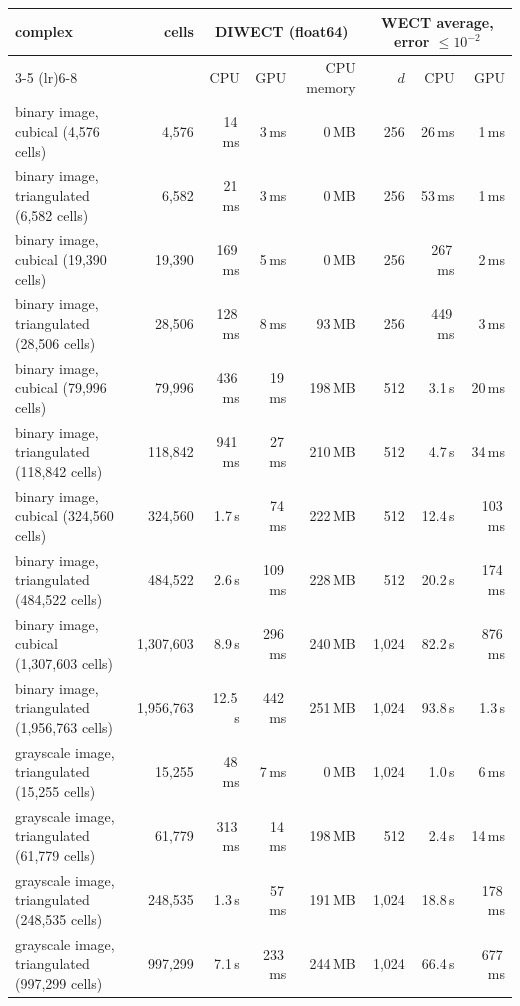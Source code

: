 
\begin{tabular}{lrrrrrrr}
\toprule
complex & cells & \multicolumn{3}{c}{DIWECT (float64)} & \multicolumn{3}{c}{WECT average, error $\leq 10^{-2}$} \\
\cmidrule(lr){3-5} \cmidrule(lr){6-8}
 & & CPU & GPU & CPU memory & $d$ & CPU & GPU \\
\midrule
binary image, cubical (4,576 cells) & 4,576 & 14\,ms & 3\,ms & 0\,MB & 256 & 26\,ms & 1\,ms \\
binary image, triangulated (6,582 cells) & 6,582 & 21\,ms & 3\,ms & 0\,MB & 256 & 53\,ms & 1\,ms \\
binary image, cubical (19,390 cells) & 19,390 & 169\,ms & 5\,ms & 0\,MB & 256 & 267\,ms & 2\,ms \\
binary image, triangulated (28,506 cells) & 28,506 & 128\,ms & 8\,ms & 93\,MB & 256 & 449\,ms & 3\,ms \\
binary image, cubical (79,996 cells) & 79,996 & 436\,ms & 19\,ms & 198\,MB & 512 & 3.1\,s & 20\,ms \\
binary image, triangulated (118,842 cells) & 118,842 & 941\,ms & 27\,ms & 210\,MB & 512 & 4.7\,s & 34\,ms \\
binary image, cubical (324,560 cells) & 324,560 & 1.7\,s & 74\,ms & 222\,MB & 512 & 12.4\,s & 103\,ms \\
binary image, triangulated (484,522 cells) & 484,522 & 2.6\,s & 109\,ms & 228\,MB & 512 & 20.2\,s & 174\,ms \\
binary image, cubical (1,307,603 cells) & 1,307,603 & 8.9\,s & 296\,ms & 240\,MB & 1,024 & 82.2\,s & 876\,ms \\
binary image, triangulated (1,956,763 cells) & 1,956,763 & 12.5\,s & 442\,ms & 251\,MB & 1,024 & 93.8\,s & 1.3\,s \\
grayscale image, triangulated (15,255 cells) & 15,255 & 48\,ms & 7\,ms & 0\,MB & 1,024 & 1.0\,s & 6\,ms \\
grayscale image, triangulated (61,779 cells) & 61,779 & 313\,ms & 14\,ms & 198\,MB & 512 & 2.4\,s & 14\,ms \\
grayscale image, triangulated (248,535 cells) & 248,535 & 1.3\,s & 57\,ms & 191\,MB & 1,024 & 18.8\,s & 178\,ms \\
grayscale image, triangulated (997,299 cells) & 997,299 & 7.1\,s & 233\,ms & 244\,MB & 1,024 & 66.4\,s & 677\,ms \\

\end{tabular}
